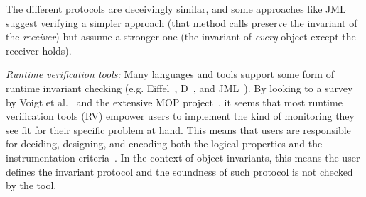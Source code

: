 The different protocols are deceivingly similar, and 
some approaches like JML suggest verifying a simpler approach (that method calls preserve the invariant of the \emph{receiver}) but assume a stronger one (the invariant of \emph{every} object except the receiver holds).






\newcommand\sepItems{\saveSpace\saveSpace\saveSpace\\*${}_{}$\\*${}_{}\,\bullet\,$}

\textit{Runtime verification tools:}
Many languages and tools support some form of runtime invariant checking (e.g. Eiffel~\cite{Meyer:1992:EL:129093}, D~\cite{Alexandrescu:2010:DPL:1875434},
and JML~\cite{Burdy2005}).
By looking to a survey by Voigt et al.~\cite{Voigt2013} and the extensive MOP project~\cite{meredith2012overview},
it seems that most runtime verification tools (RV) empower users
to implement the kind of monitoring they see fit for their specific problem at hand. This means that users are responsible for deciding, designing, and encoding both the logical properties and the instrumentation criteria~\cite{meredith2012overview}.
In the context of object-invariants, this means the user defines the invariant protocol and the soundness of such protocol is not checked by the tool.

